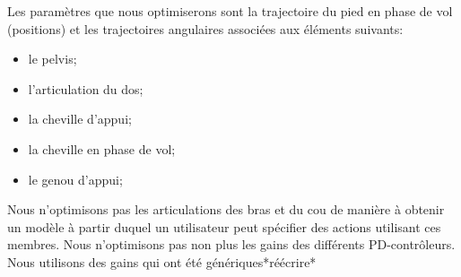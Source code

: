 \documentclass[runningheads,a4paper]{llncs}
\begin{document}
Les paramètres que nous optimiserons sont la trajectoire du pied en phase de vol (positions) et les trajectoires angulaires associées aux éléments suivants:
\begin{itemize}
\item{le pelvis;}
\item{l'articulation du dos;}
\item{la cheville d'appui;}
\item{la cheville en phase de vol;}
\item{le genou d'appui;}
\end{itemize}

Nous n'optimisons pas les articulations des bras et du cou de manière à obtenir un modèle à partir duquel un utilisateur peut spécifier des actions utilisant ces membres. Nous n'optimisons pas non plus les gains des différents PD-contrôleurs. Nous utilisons des gains qui ont été génériques*réécrire*

%
\end{document}
